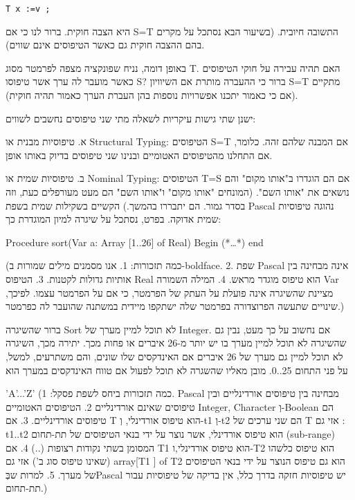 \begin{verbatim}
T x :=v ;

\end{verbatim}

      היא הצבה חוקית. ברור לנו כי אם S=T התשובה חיובית. (בשיעור הבא נסתכל על מקרים בהם ההצבה חוקית גם כאשר הטיפוסים אינם שווים).

      באופן דומה, נניח שפונקציה מצפה לפרמטר מסוג T. האם תהיה עבירה על חוקי הטיפוסים כאשר מועבר לה ערך אשר טיפוסו S? ברור כי ההעברה מותרת אם השיוויון S=T מתקיים (אם כי כאמור יתכנו אפשרויות נוספות בהן העברת הערך כאמור תהיה חוקית).

      ישנן שתי גישות עיקריות לשאלה מתי שני טיפוסים נחשבים לשווים:

      א. טיפוסיות מבנית או Structural Typing: הטיפוסים S=T אם המבנה שלהם זהה. כלומר, אם התחלנו מהטיפוסים האטומיים ובנינו שני טיפוסים בדיוק באותו אופן.

      ב. טיפוסיות שמית או Nominal Typing: הטיפוסים T=S אם הם הוגדרו ב"אותו מקום" והם נושאים את "אותו השם". (המונחים "אותו מקום" ו"אותו השם" הם מעט מעורפלים כעת, וזה בסדר גמור. הם יתבררו בהמשך.)
      הקשיים בשקילות שמית
      בשפת Pascal נהוגה טיפוסיות שמית אדוקה. בפרט, נסתכל על שיגרה למיון המוגדרת כך:

      Procedure sort(Var a: Array [1..26] of Real)
      Begin
      (*…*)
      end

      (כמה תזכורות:
      1. אנו מסמנים מילים שמורות ב-boldface.
      2. שפת Pascal אינה מבחינה בין אותיות גדולות לקטנות.
      3. הטיפוס Real הוא טיפוס מוגדר מראש.
      4. המילה השמורה Var מציינת שהשיגרה אינה פועלת על העתק של הפרמטר, כי אם על הפרמטר עצמו. לפיכך, שינויים שתעשה הפרוצדורה בפרמטר שלה ישתקפו מיידית במשתנה שהועבר לה כפרמטר.)

      ברור שהשיגרה Sort לא תוכל למיין מערך של Integer. אם נחשוב על כך מעט, נבין גם שהשיגרה לא תוכל למיין מערך בו יש יותר מ-26 איברים או פחות מכך. יתירה מכך, השיגרה לא תוכל למיין גם מערך של 26 איברים אם האינדקסים שלו שונים, והם משתרעים, למשל, על פני התחום 25..0. מובן מאליו שהשגרה לא תוכל לפעול אם טווח האינדקסים במערך הוא

      ’A’...’Z’
      (כמה תזכורות ביחס לשפת פסקל:
      1. Pascal מבחינה בין טיפוסים אורדינליים ובין טיפוסים שאינם אורדינליים
      2. הטיפוסים האטומיים Integer, Character וְ-Boolean הם טיפוסים אורדינליים.
      3. אם T הוא טיפוס אורדינלי, וְ-t1 וְ-t2 הם שני ערכים של T אזי גם : t1..t2 הוא טיפוס אורדינלי, אשר נוצר על ידי בנאי הטיפוסים של תת-תחום (sub-range) המסומן בשתי נקודות רצופות (..)
      4. אם T1 הוא טיפוס אורדינלי,ו-T2 הוא טיפוס כלשהו (שאינו טיפוס סוג ב') אזי גם array[T1 ] of T2 הוא גם טיפוס הנוצר על ידי בנאי הטיפוסים של מערך.
      5. למרות שבְּPascal יש טיפוסיות חזקה בדרך כלל, אין בדיקה של טיפוסיות עבור תת-תחום.)

